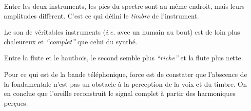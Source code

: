 \documentclass[a4paper]{report}
\begin{document}
Entre les deux instruments, les pics du spectre sont au même endroit, mais leurs amplitudes diffèrent.
C'est ce qui défini le \emph{timbre} de l'instrument.

Le son de véritables instruments (\emph{i.e.} avec un humain au bout) est de loin plus chaleureux et \emph{``complet''} que celui du synthé.

Entre la flute et le hautbois, le second semble plus \emph{``riche''} et la flute plus nette.

Pour ce qui est de la bande téléphonique, force est de constater que l'abscence de la fondamentale n'est pas un obstacle à la perception de la voix et du timbre. On en conclue que l'oreille reconstruit le signal complet à partir des harmoniques perçues.
\end{document}
